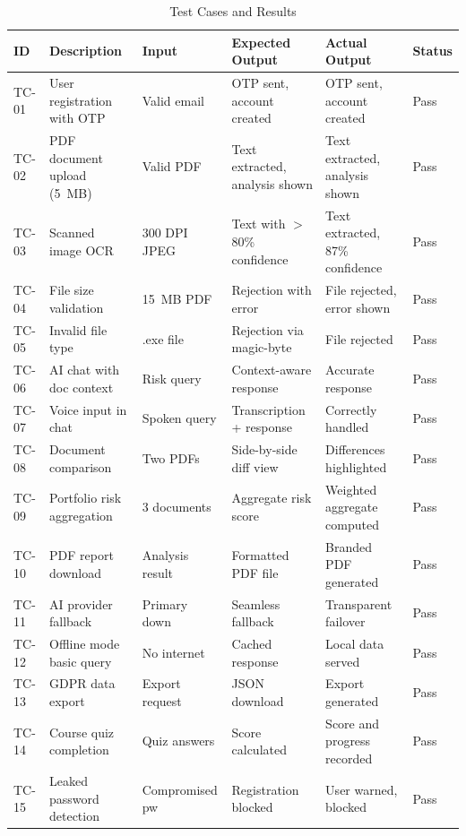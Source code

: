 \documentclass[12pt,a4paper,oneside]{report}
\begin{document}
\begin{table}[htbp]
\centering
\caption{Test Cases and Results}
\label{tab:testcases}
\scriptsize
\begin{tabular}{|p{0.8cm}|p{3cm}|p{2cm}|p{2.5cm}|p{2.5cm}|p{0.8cm}|}
\hline
\textbf{ID} & \textbf{Description} & \textbf{Input} & \textbf{Expected Output} & \textbf{Actual Output} & \textbf{Status} \\
\hline
TC-01 & User registration with OTP & Valid email & OTP sent, account created & OTP sent, account created & Pass \\ \hline
TC-02 & PDF document upload (5~MB) & Valid PDF & Text extracted, analysis shown & Text extracted, analysis shown & Pass \\ \hline
TC-03 & Scanned image OCR & 300 DPI JPEG & Text with $>$80\% confidence & Text extracted, 87\% confidence & Pass \\ \hline
TC-04 & File size validation & 15~MB PDF & Rejection with error & File rejected, error shown & Pass \\ \hline
TC-05 & Invalid file type & .exe file & Rejection via magic-byte & File rejected & Pass \\ \hline
TC-06 & AI chat with doc context & Risk query & Context-aware response & Accurate response & Pass \\ \hline
TC-07 & Voice input in chat & Spoken query & Transcription + response & Correctly handled & Pass \\ \hline
TC-08 & Document comparison & Two PDFs & Side-by-side diff view & Differences highlighted & Pass \\ \hline
TC-09 & Portfolio risk aggregation & 3 documents & Aggregate risk score & Weighted aggregate computed & Pass \\ \hline
TC-10 & PDF report download & Analysis result & Formatted PDF file & Branded PDF generated & Pass \\ \hline
TC-11 & AI provider fallback & Primary down & Seamless fallback & Transparent failover & Pass \\ \hline
TC-12 & Offline mode basic query & No internet & Cached response & Local data served & Pass \\ \hline
TC-13 & GDPR data export & Export request & JSON download & Export generated & Pass \\ \hline
TC-14 & Course quiz completion & Quiz answers & Score calculated & Score and progress recorded & Pass \\ \hline
TC-15 & Leaked password detection & Compromised pw & Registration blocked & User warned, blocked & Pass \\ \hline
\end{tabular}
\end{table}
\end{document}

